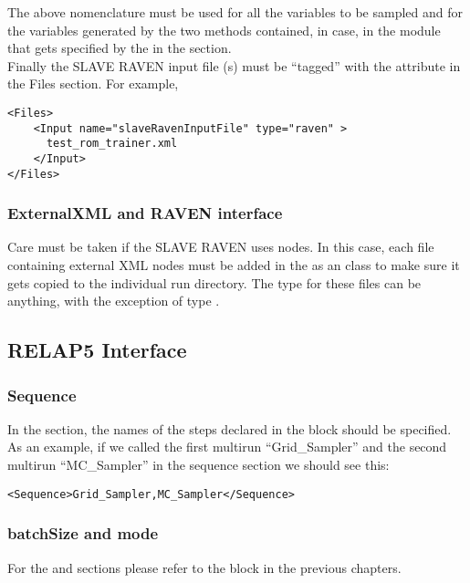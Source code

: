 The above nomenclature must be used for all the variables to be sampled and for the variables generated by the two methods contained, in case, in
the module that gets specified by the  in the  section.
\\ Finally the SLAVE RAVEN input file (s) must be ``tagged'' with the attribute   in the Files section. For example,

\begin{lstlisting}[style=XML]
<Files>
    <Input name="slaveRavenInputFile" type="raven" >
      test_rom_trainer.xml
    </Input>
</Files>
\end{lstlisting}

\subsubsection{ExternalXML and RAVEN interface}
Care must be taken if the SLAVE RAVEN uses  nodes.  In this case, each file containing
external XML nodes must be added in the  as an  class  to make sure it gets copied to
the individual run directory.  The type for these files can be anything, with the exception of type
.

\subsection{RELAP5 Interface}
\label{subsec:RELAP5Interface}

\subsubsection{Sequence}
In the  section, the names of the steps declared in the
 block should be specified.
%
As an example, if we called the first multirun ``Grid\_Sampler'' and the second
multirun ``MC\_Sampler'' in the sequence section we should see this:
\begin{lstlisting}[style=XML]
<Sequence>Grid_Sampler,MC_Sampler</Sequence>
\end{lstlisting}

\subsubsection{batchSize and mode}
For the  and  sections please refer to the
 block in the previous chapters.
%
